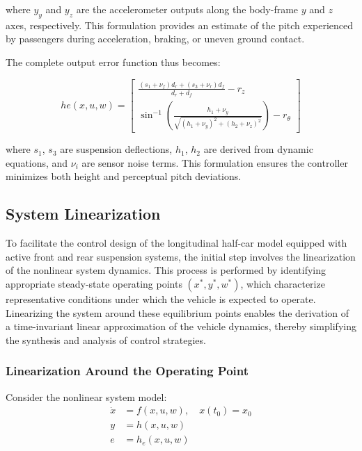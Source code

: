 \documentclass[]{report}
\begin{document}
	where $y_y$ and $y_z$ are the accelerometer outputs along the body-frame $y$ and $z$ axes, respectively. This formulation provides an estimate of the pitch experienced by passengers during acceleration, braking, or uneven ground contact.
	
	
	The complete output error function thus becomes:
	
	\begin{equation}
		he(x, u, w) =
		\begin{bmatrix}
			\displaystyle \frac{(s_1 + \nu_f) d_r + (s_3 + \nu_r) d_f}{d_r + d_f} - r_z \\
			\displaystyle \sin^{-1}\left( \frac{h_1 + \nu_y}{\sqrt{(h_1 + \nu_y)^2 + (h_2 + \nu_z)^2}} \right) - r_\theta
		\end{bmatrix}
	\end{equation}
	
	where $s_1$, $s_3$ are suspension deflections, $h_1$, $h_2$ are derived from dynamic equations, and $\nu_i$ are sensor noise terms. This formulation ensures the controller minimizes both height and perceptual pitch deviations. 
	
	\subsection{System Linearization}
	
	To facilitate the control design of the longitudinal half-car model equipped with active front and rear suspension systems, the initial step involves the linearization of the nonlinear system dynamics. This process is performed by identifying appropriate steady-state operating points \((x^*, y^*, w^*)\), which characterize representative conditions under which the vehicle is expected to operate. Linearizing the system around these equilibrium points enables the derivation of a time-invariant linear approximation of the vehicle dynamics, thereby simplifying the synthesis and analysis of control strategies.
	
	\subsubsection{Linearization Around the Operating Point}
	
	Consider the nonlinear system model:
	\begin{equation}
		\label{eq:nonlinear_model}
		\begin{aligned}
			\dot{x} &= f(x, u, w), \quad x(t_0) = x_0 \\
			y &= h(x, u, w) \\
			e &= h_e(x, u, w)
		\end{aligned}
	\end{equation}
	
\end{document}
